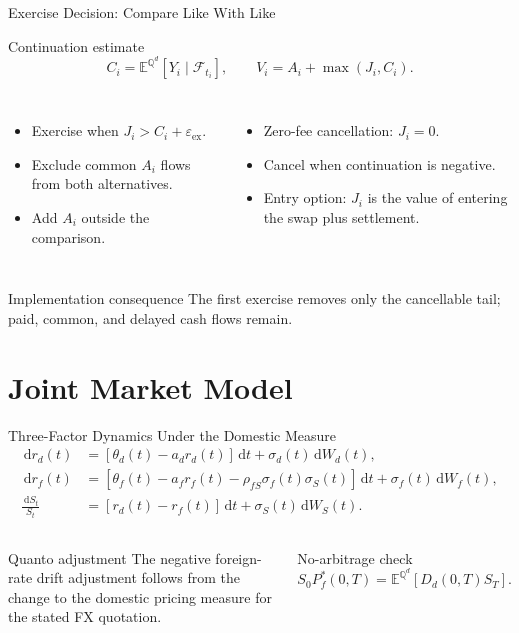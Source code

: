 \documentclass[aspectratio=169]{beamer}
\newcommand{\Qd}{\mathbb{Q}^{d}}
\newcommand{\E}{\mathbb{E}}
\newcommand{\F}{\mathcal{F}}
\newcommand{\dd}{\,\mathrm{d}}
\begin{document}
\begin{frame}{Exercise Decision: Compare Like With Like}
  \begin{block}{Continuation estimate}
    \[
      C_i=\E^{\Qd}\!\left[Y_i\mid\F_{t_i}\right],
      \qquad
      V_i=A_i+\max(J_i,C_i).
    \]
  \end{block}
  \begin{columns}[T,onlytextwidth]
      \begin{itemize}
        \item Exercise when $J_i>C_i+\varepsilon_{\mathrm{ex}}$.
        \item Exclude common $A_i$ flows from both alternatives.
        \item Add $A_i$ outside the comparison.
      \end{itemize}
      \begin{itemize}
        \item Zero-fee cancellation: $J_i=0$.
        \item Cancel when continuation is negative.
        \item Entry option: $J_i$ is the value of entering the swap plus settlement.
      \end{itemize}
  \end{columns}
  \begin{alertblock}{Implementation consequence}
    The first exercise removes only the cancellable tail; paid, common, and
    delayed cash flows remain.
  \end{alertblock}
\end{frame}

\section{Joint Market Model}

\begin{frame}{Three-Factor Dynamics Under the Domestic Measure}
  \small
  \begin{align*}
    \dd r_d(t) &= [\theta_d(t)-a_dr_d(t)]\dd t+\sigma_d(t)\dd W_d(t),\\
    \dd r_f(t) &= [\theta_f(t)-a_fr_f(t)-\rho_{fS}\sigma_f(t)\sigma_S(t)]\dd t
                  +\sigma_f(t)\dd W_f(t),\\
    \frac{\dd S_t}{S_t} &= [r_d(t)-r_f(t)]\dd t+\sigma_S(t)\dd W_S(t).
  \end{align*}
  \begin{columns}[T,onlytextwidth]
      \begin{block}{Quanto adjustment}
        The negative foreign-rate drift adjustment follows from the change to
        the domestic pricing measure for the stated FX quotation.
      \end{block}
      \begin{block}{No-arbitrage check}
        \[
          S_0P_f^{*}(0,T)=\E^{\Qd}[D_d(0,T)S_T].
        \]
      \end{block}
  \end{columns}
\end{frame}
\end{document}
